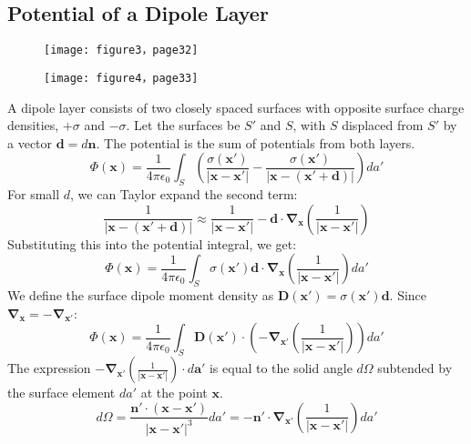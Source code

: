 \documentclass[12pt, a4paper]{article}
\begin{document}
	
	\subsection{Potential of a Dipole Layer}
    \begin{figure}[h]
    	\centering
    	\texttt{[image: figure3，page32]}
    	\caption{}
    	\label{fig:figure3page32}
    \end{figure}
    
   
    \begin{figure}
    	\centering
    	\texttt{[image: figure4，page33]}
	    \caption{}
	    \label{fig:figure4page33}
    \end{figure}
	A dipole layer consists of two closely spaced surfaces with opposite surface charge densities, $+\sigma$ and $-\sigma$. Let the surfaces be $S'$ and $S$, with $S$ displaced from $S'$ by a vector $\bm{d} = d\bm{n}$. The potential is the sum of potentials from both layers.
	\begin{equation}
		\Phi(\bm{x}) = \frac{1}{4\pi\epsilon_0} \int_S \left( \frac{\sigma(\bm{x}')}{|\bm{x}-\bm{x}'|} - \frac{\sigma(\bm{x}')}{|\bm{x}-(\bm{x}'+\bm{d})|} \right) da'
	\end{equation}
	For small $d$, we can Taylor expand the second term:
	\begin{equation}
		\frac{1}{|\bm{x}-(\bm{x}'+\bm{d})|} \approx \frac{1}{|\bm{x}-\bm{x}'|} - \bm{d} \cdot \bm{\nabla}_{\bm{x}} \left(\frac{1}{|\bm{x}-\bm{x}'|}\right)
	\end{equation}
	Substituting this into the potential integral, we get:
	\begin{equation}
		\Phi(\bm{x}) = \frac{1}{4\pi\epsilon_0} \int_S \sigma(\bm{x}')\bm{d} \cdot \bm{\nabla}_{\bm{x}} \left(\frac{1}{|\bm{x}-\bm{x}'|}\right) da'
	\end{equation}
	We define the surface dipole moment density as $\bm{D}(\bm{x}') = \sigma(\bm{x}')\bm{d}$. Since $\bm{\nabla}_{\bm{x}} = -\bm{\nabla}_{\bm{x}'}$:
	\begin{equation}
		\Phi(\bm{x}) = \frac{1}{4\pi\epsilon_0} \int_S \bm{D}(\bm{x}') \cdot \left(-\bm{\nabla}_{\bm{x}'}\left(\frac{1}{|\bm{x}-\bm{x}'|}\right)\right) da'
	\end{equation}
	The expression $-\bm{\nabla}_{\bm{x}'}\left(\frac{1}{|\bm{x}-\bm{x}'|}\right) \cdot d\bm{a}'$ is equal to the solid angle $d\Omega$ subtended by the surface element $da'$ at the point $\bm{x}$.
	\begin{equation}
		d\Omega = \frac{\bm{n}' \cdot (\bm{x}-\bm{x}')}{|\bm{x}-\bm{x}'|^3} da' = -\bm{n}' \cdot \bm{\nabla}_{\bm{x}'}\left(\frac{1}{|\bm{x}-\bm{x}'|}\right) da'
	\end{equation}
\end{document}
